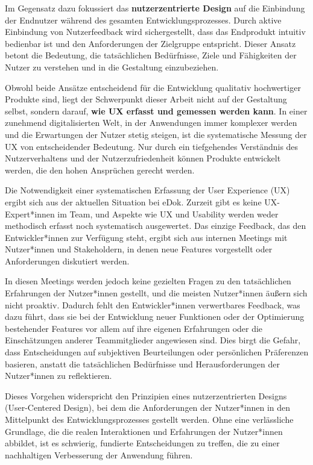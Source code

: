 \documentclass[12pt,oneside]{article}
\begin{document}
Im Gegensatz dazu fokussiert das \textbf{nutzerzentrierte Design} auf die Einbindung der Endnutzer während des gesamten Entwicklungsprozesses. Durch aktive Einbindung von Nutzerfeedback wird sichergestellt, dass das Endprodukt intuitiv bedienbar ist und den Anforderungen der Zielgruppe entspricht. Dieser Ansatz betont die Bedeutung, die tatsächlichen Bedürfnisse, Ziele und Fähigkeiten der Nutzer zu verstehen und in die Gestaltung einzubeziehen.

Obwohl beide Ansätze entscheidend für die Entwicklung qualitativ hochwertiger Produkte sind, liegt der Schwerpunkt dieser Arbeit nicht auf der Gestaltung selbst, sondern darauf, \textbf{wie UX erfasst und gemessen werden kann}. In einer zunehmend digitalisierten Welt, in der Anwendungen immer komplexer werden und die Erwartungen der Nutzer stetig steigen, ist die systematische Messung der UX von entscheidender Bedeutung. Nur durch ein tiefgehendes Verständnis des Nutzerverhaltens und der Nutzerzufriedenheit können Produkte entwickelt werden, die den hohen Ansprüchen gerecht werden.

Die Notwendigkeit einer systematischen Erfassung der User Experience (UX) ergibt sich aus der aktuellen Situation bei eDok. Zurzeit gibt es keine UX-Expert*innen im Team, und Aspekte wie UX und Usability werden weder methodisch erfasst noch systematisch ausgewertet. Das einzige Feedback, das den Entwickler*innen zur Verfügung steht, ergibt sich aus internen Meetings mit Nutzer*innen und Stakeholdern, in denen neue Features vorgestellt oder Anforderungen diskutiert werden.

In diesen Meetings werden jedoch keine gezielten Fragen zu den tatsächlichen Erfahrungen der Nutzer*innen gestellt, und die meisten Nutzer*innen äußern sich nicht proaktiv. Dadurch fehlt den Entwickler*innen verwertbares Feedback, was dazu führt, dass sie bei der Entwicklung neuer Funktionen oder der Optimierung bestehender Features vor allem auf ihre eigenen Erfahrungen oder die Einschätzungen anderer Teammitglieder angewiesen sind. Dies birgt die Gefahr, dass Entscheidungen auf subjektiven Beurteilungen oder persönlichen Präferenzen basieren, anstatt die tatsächlichen Bedürfnisse und Herausforderungen der Nutzer*innen zu reflektieren.

Dieses Vorgehen widerspricht den Prinzipien eines nutzerzentrierten Designs (User-Centered Design), bei dem die Anforderungen der Nutzer*innen in den Mittelpunkt des Entwicklungsprozesses gestellt werden. Ohne eine verlässliche Grundlage, die die realen Interaktionen und Erfahrungen der Nutzer*innen abbildet, ist es schwierig, fundierte Entscheidungen zu treffen, die zu einer nachhaltigen Verbesserung der Anwendung führen.
\end{document}
